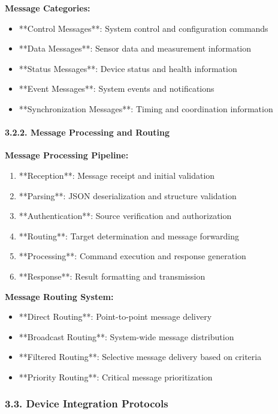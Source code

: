 \documentclass[12pt,a4paper]{article}
\begin{document}
\textbf{Message Categories:}

\begin{itemize}
\item **Control Messages**: System control and configuration commands
\item **Data Messages**: Sensor data and measurement information
\item **Status Messages**: Device status and health information
\item **Event Messages**: System events and notifications
\item **Synchronization Messages**: Timing and coordination information

\end{itemize}
\paragraph{3.2.2. Message Processing and Routing}

\textbf{Message Processing Pipeline:}

\begin{enumerate}
\item **Reception**: Message receipt and initial validation
\item **Parsing**: JSON deserialization and structure validation
\item **Authentication**: Source verification and authorization
\item **Routing**: Target determination and message forwarding
\item **Processing**: Command execution and response generation
\item **Response**: Result formatting and transmission

\end{enumerate}
\textbf{Message Routing System:}

\begin{itemize}
\item **Direct Routing**: Point-to-point message delivery
\item **Broadcast Routing**: System-wide message distribution
\item **Filtered Routing**: Selective message delivery based on criteria
\item **Priority Routing**: Critical message prioritization

\end{itemize}
\subsubsection{3.3. Device Integration Protocols}
\end{document}

